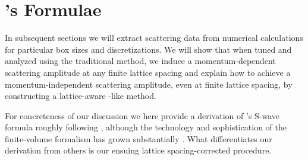 \section{\Luscher's Formulae}\label{sec:luescher}

In subsequent sections we will extract scattering data from numerical calculations for particular box sizes and discretizations.
We will show that when tuned and analyzed using the traditional \Luscher method, we induce a momentum-dependent scattering amplitude at any finite lattice spacing and explain how to achieve a momentum-independent scattering amplitude, even at finite lattice spacing, by constructing a lattice-aware \Luscher-like method.

For concreteness of our discussion we here provide a derivation of \Luscher's S-wave formula roughly following , although the technology and sophistication of the finite-volume formalism has grown substantially \cite{Beane:2010ny,Ozaki:2012ce,Hansen:2012tf,Briceno:2013hya,Briceno:2013lba,Li:2014wga,Zhu:2019dho}. What differentiates our derivation from others is our ensuing lattice spacing-corrected procedure.



